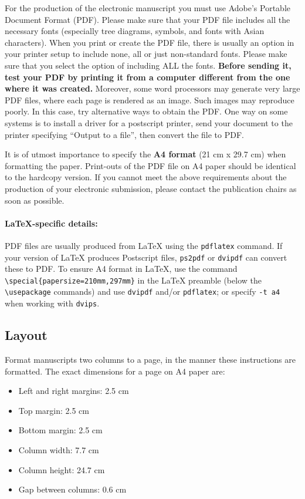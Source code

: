\documentclass[11pt,a4paper]{article}
\begin{document}
For the production of the electronic manuscript you must use Adobe's Portable Document Format (PDF).
Please make sure that your PDF file includes all the necessary fonts (especially tree diagrams, symbols, and fonts with Asian characters).
When you print or create the PDF file, there is usually an option in your printer setup to include none, all or just non-standard fonts.
Please make sure that you select the option of including ALL the fonts.
\textbf{Before sending it, test your PDF by printing it from a computer different from the one where it was created.}
Moreover, some word processors may generate very large PDF files, where each page is rendered as an image.
Such images may reproduce poorly.
In this case, try alternative ways to obtain the PDF.
One way on some systems is to install a driver for a postscript printer, send your document to the printer specifying ``Output to a file'', then convert the file to PDF.

It is of utmost importance to specify the \textbf{A4 format} (21 cm x 29.7 cm) when formatting the paper.
Print-outs of the PDF file on A4 paper should be identical to the hardcopy version.
If you cannot meet the above requirements about the production of your electronic submission, please contact the publication chairs as soon as possible.

\paragraph{\LaTeX-specific details:}
PDF files are usually produced from \LaTeX{} using the \texttt{\small pdflatex} command.
If your version of \LaTeX{} produces Postscript files, \texttt{\small ps2pdf} or \texttt{\small dvipdf} can convert these to PDF.
To ensure A4 format in \LaTeX, use the command {\small\verb|\special{papersize=210mm,297mm}|}
in the \LaTeX{} preamble (below the {\small\verb|\usepackage|} commands) and use \texttt{\small dvipdf} and/or \texttt{\small pdflatex}; or specify \texttt{\small -t a4} when working with \texttt{\small dvips}.

\subsection{Layout}
\label{ssec:layout}

Format manuscripts two columns to a page, in the manner these
instructions are formatted.
The exact dimensions for a page on A4 paper are:

\begin{itemize}
\item Left and right margins: 2.5 cm
\item Top margin: 2.5 cm
\item Bottom margin: 2.5 cm
\item Column width: 7.7 cm
\item Column height: 24.7 cm
\item Gap between columns: 0.6 cm
\end{itemize}
\end{document}
